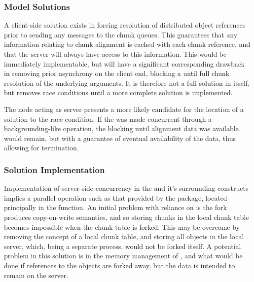 
\subsubsection{Model Solutions}

A client-side solution exists in forcing resolution of distributed object
references prior to sending any messages to the chunk queues.
This guarantees that any information relating to chunk alignment is cached with
each chunk reference, and that the server will always have access to this
information.
This would be immediately implementable, but will have a significant
corresponding drawback in removing prior asynchrony on the client end, blocking
a  until full chunk resolution of the
underlying arguments.
It is therefore not a full solution in itself, but removes race conditions
until a more complete solution is implemented.

The node acting as server presents a more likely candidate for the location of
a solution to the race condition.
If the  was made concurrent through a
backgrounding-like operation, the blocking until alignment data was available
would remain, but with a guarantee of eventual availability of the data, thus
allowing for termination.

\subsubsection{Solution Implementation}

Implementation of server-side concurrency in the
 and it's surrounding constructs implies a
parallel operation such as that provided by the  package,
located principally in the  function.
An initial problem with reliance on  is the
fork produces copy-on-write semantics, and so storing chunks in the local chunk
table becomes impossible when the chunk table is forked.
This may be overcome by removing the concept of a local chunk table, and
storing all objects in the local  server, which, being a separate
process, would not be forked itself. 
A potential problem in this solution is in the memory management of
, and what would be done if references to the \R objects are forked
away, but the data is intended to remain on the server.


